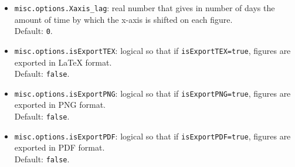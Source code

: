 \begin{itemize}
\begin{itemize}
\item \lstinline[basicstyle = \mlttfamily \small ]!misc.options.Xaxis_lag!: real number that gives in number of days the amount of time by which the x-axis is shifted on each figure. \\Default: \lstinline[basicstyle = \mlttfamily \small ]!0!. 
\item \lstinline[basicstyle = \mlttfamily \small ]!misc.options.isExportTEX!: logical so that if \lstinline[basicstyle = \mlttfamily \small ]!isExportTEX=true!, figures are exported in \LaTeX{} format. \\Default: \lstinline[basicstyle = \mlttfamily \small ]!false!.
\item \lstinline[basicstyle = \mlttfamily \small ]!misc.options.isExportPNG!: logical so that if \lstinline[basicstyle = \mlttfamily \small ]!isExportPNG=true!,  figures are exported in PNG format. \\Default: \lstinline[basicstyle = \mlttfamily \small ]!false!.
\item \lstinline[basicstyle = \mlttfamily \small ]!misc.options.isExportPDF!: logical so that if \lstinline[basicstyle = \mlttfamily \small ]!isExportPDF=true!,  figures are exported in PDF format. \\Default: \lstinline[basicstyle = \mlttfamily \small ]!false!.
\end{itemize}
\end{itemize}